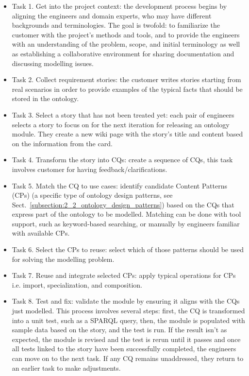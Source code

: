 \begin{itemize}
    \item Task 1. Get into the project context: the development process begins by aligning the engineers and domain experts, who may have different backgrounds and terminologies. The goal is twofold: to familiarize the customer with the project's methods and tools, and to provide the engineers with an understanding of the problem, scope, and initial terminology as well as establishing a collaborative environment for sharing documentation and discussing modelling issues.

    \item Task 2. Collect requirement stories: the customer writes stories starting from real scenarios in order to provide examples of the typical facts that should be stored in the ontology.

    \item Task 3. Select a story that has not been treated yet: each pair of engineers selects a story to focus on for the next iteration for releasing an ontology module. They create a new wiki page with the story's title and content based on the information from the card.

    \item Task 4. Transform the story into CQs: create a sequence of CQs, this task involves customer for having feedback/clarifications.

    \item Task 5. Match the CQ to use cases: identify candidate Content Patterns (CPs) (a specific type of ontology design patterns, see Sect.~\ref{subsection:2_2_ontology_design_patterns}) based on the CQs that express part of the ontology to be modelled. Matching can be done with tool support, such as keyword-based searching, or manually by engineers familiar with available CPs.

    \item Task 6. Select the CPs to reuse: select which of those patterns should be used for solving the modelling problem.

    \item Task 7. Reuse and integrate selected CPs: apply typical operations for CPs i.e. import, specialization, and composition. 

    \item Task 8. Test and fix: validate the module by ensuring it aligns with the CQs just modelled. This process involves several steps: first, the CQ is transformed into a unit test, such as a SPARQL query, then, the module is populated with sample data based on the story, and the test is run. If the result isn't as expected, the module is revised and the test is rerun until it passes and once all tests linked to the story have been successfully completed, the engineers can move on to the next task. If any CQ remains unaddressed, they return to an earlier task to make adjustments.


\end{itemize}
